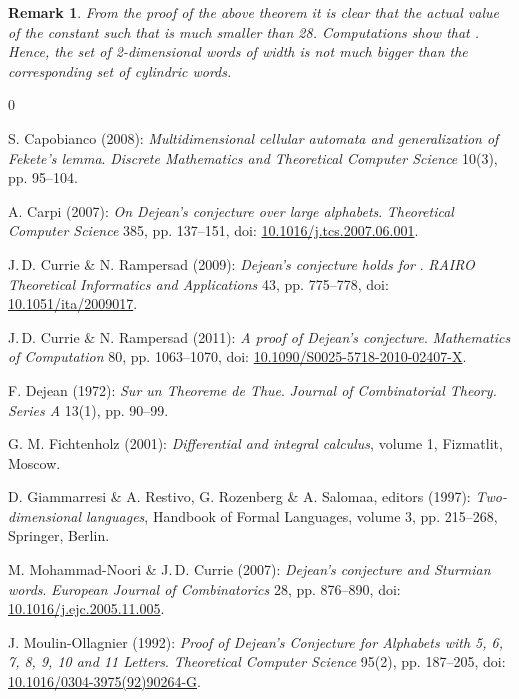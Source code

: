 \documentclass[submission,copyright]{eptcs}\providecommand{\event}{WORDS 2011}
\newtheorem {Rmk} {Remark}
\begin{document}
\begin{Rmk}
From the proof of the above theorem it is clear that the actual value of the constant  such that  is much smaller than 28. Computations show that . Hence, the set  of 2-dimensional words of width  is not much bigger than the corresponding set  of cylindric words.
\end{Rmk}


\begin {thebibliography} {0}
\providecommand{\doi}[1]{\href{http://dx.doi.org/#1}{#1}}

S. Capobianco (2008): \textit{Multidimensional cellular automata and generalization of Fekete's lemma}. {\slshape Discrete Mathematics and Theoretical Computer Science} 10(3), pp. 95--104.

A. Carpi (2007): {\it On Dejean's conjecture over large alphabets}. {\slshape Theoretical Computer Science} 385, pp. 137--151, doi: \doi{10.1016/j.tcs.2007.06.001}.

J.\,D. Currie \& N. Rampersad (2009): {\it Dejean's conjecture holds for }. {\slshape RAIRO Theoretical Informatics and Applications } 43, pp. 775--778, doi: \doi{10.1051/ita/2009017}.

J.\,D. Currie \& N. Rampersad (2011): {\it A proof of Dejean's conjecture}. {\slshape Mathematics of Computation}  80, pp. 1063--1070, doi: \doi{10.1090/S0025-5718-2010-02407-X}.

F. Dejean (1972): {\it Sur un Theoreme de Thue}. {\slshape Journal of Combinatorial Theory. Series A} 13(1), pp. 90--99.

G. M. Fichtenholz (2001): \textit{Differential and integral calculus}, volume 1, Fizmatlit, Moscow.

D. Giammarresi \& A. Restivo,  G. Rozenberg \& A. Salomaa, editors (1997): \textit{Two-dimensional languages}, Handbook of Formal Languages, volume 3, pp. 215--268, Springer, Berlin. 

M. Mohammad-Noori \& J.\,D. Currie (2007): {\it Dejean's conjecture and Sturmian words}. {\slshape European Journal of Combinatorics} 28, pp. 876--890, doi: \doi{10.1016/j.ejc.2005.11.005}.

J. Moulin-Ollagnier (1992): {\it Proof of Dejean's Conjecture for Alphabets with 5, 6, 7, 8, 9, 10 and 11 Letters}. {\slshape Theoretical Computer Science} 95(2), pp. 187--205, doi: \doi{10.1016/0304-3975(92)90264-G}.


\end{thebibliography}
\end{document}

